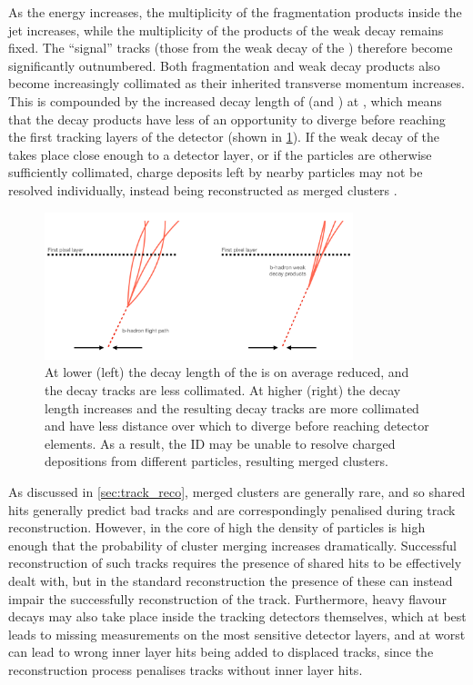 As the \bjet energy increases, the multiplicity of the fragmentation products inside the jet increases, while the multiplicity of the products of the weak decay remains fixed.
The ``signal'' tracks (those from the weak decay of the \bhadron) therefore become significantly outnumbered.
Both fragmentation and \bhadron weak decay products also become increasingly collimated as their inherited transverse momentum increases.
This is compounded by the increased decay length of \bhadrons (and \chadrons) at \highpt, which means that the decay products have less of an opportunity to diverge before reaching the first tracking layers of the detector (shown in \cref{fig:high_pt_b_decay}).
If the weak decay of the \bhadron takes place close enough to a detector layer, or if the particles are otherwise sufficiently collimated, charge deposits left by nearby particles may not be resolved individually, instead being reconstructed as merged clusters \cite{PERF-2015-08}.

\begin{figure}[!htbp]
  \centering
  \includegraphics[width=0.8\textwidth]{chapters/3.tracking/figs/high_pt_b_decay.pdf}
  \caption{
    At lower \pt (left) the decay length of the \bhadron is on average reduced, and the decay tracks are less collimated.
    At higher \pt (right) the \bhadron decay length increases and the resulting decay tracks are more collimated and have less distance over which to diverge before reaching detector elements.
    As a result, the ID may be unable to resolve charged depositions from different particles, resulting merged clusters.
  }
  \label{fig:high_pt_b_decay}
\end{figure}

As discussed in \cref{sec:track_reco}, merged clusters are generally rare, and so shared hits generally predict bad tracks and are correspondingly penalised during track reconstruction.
However, in the core of high \pT \bjets the density of particles is high enough that the probability of cluster merging increases dramatically.
Successful reconstruction of such tracks requires the presence of shared hits to be effectively dealt with, but in the standard reconstruction the presence of these can instead impair the successfully reconstruction of the track.
Furthermore, heavy flavour decays may also take place inside the tracking detectors themselves, which at best leads to missing measurements on the most sensitive detector layers, and at worst can lead to wrong inner layer hits being added to displaced tracks, since the reconstruction process penalises tracks without inner layer hits.

